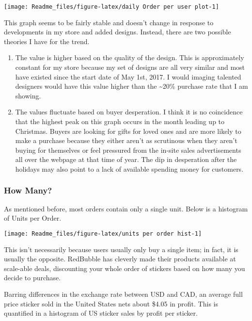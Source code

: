 \documentclass[]{article}
\begin{document}
\begin{center}\texttt{[image: Readme\_files/figure-latex/daily Order per user plot-1]} \end{center}

This graph seems to be fairly stable and doesn't change in response to
developments in my store and added designs. Instead, there are two
possible theories I have for the trend.

\begin{enumerate}
\def\labelenumi{\arabic{enumi}.}
\item
  The value is higher based on the quality of the design. This is
  approximately constant for my store because my set of designs are all
  very similar and most have existed since the start date of May 1st,
  2017. I would imaging talented designers would have this value higher
  than the \textasciitilde{}20\% purchase rate that I am showing.
\item
  The values fluctuate based on buyer desperation. I think it is no
  coincidence that the highest peak on this graph occurs in the month
  leading up to Christmas. Buyers are looking for gifts for loved ones
  and are more likely to make a purchase because they either aren't as
  scrutinous when they aren't buying for themselves or feel pressured
  from the in-site sales advertisements all over the webpage at that
  time of year. The dip in desperation after the holidays may also point
  to a lack of available spending money for customers.
\end{enumerate}

\subsubsection{How Many?}\label{how-many}

As mentioned before, most orders contain only a single unit. Below is a
histogram of Units per Order.

\begin{center}\texttt{[image: Readme\_files/figure-latex/units per order hist-1]} \end{center}

This isn't necessarily because users usually only buy a single item; in
fact, it is usually the opposite. RedBubble has cleverly made their
products available at scale-able deals, discounting your whole order of
stickers based on how many you decide to purchase.

Barring differences in the exchange rate between USD and CAD, an average
full price sticker sold in the United States nets about \$4.05 in
profit. This is quantified in a histogram of US sticker sales by profit
per sticker.
\end{document}
